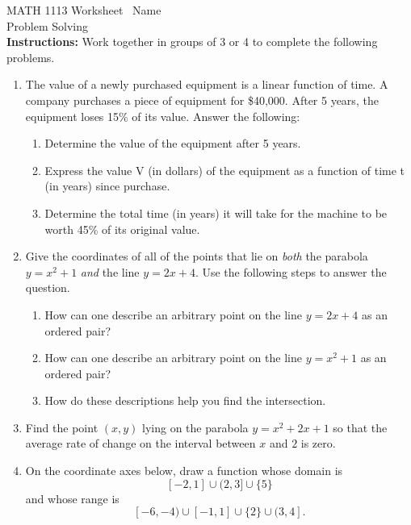 \documentclass[11pt]{article}
\begin{document}
\noindent MATH 1113   \quad\quad\quad\quad\quad Worksheet \quad\quad\quad\quad\quad\   Name \underline{\phantom{alphabetsoupismyveryveryfavorite}}\\ 
\noindent Problem Solving \\

\noindent \textbf{Instructions:}  Work together in groups of  3 or 4 to complete the following problems.


\begin{enumerate}



\item The value of a newly purchased equipment is a linear function of time. A company purchases a piece of equipment for \$40,000. After 5 years, the equipment loses 15\% of its value. Answer the following:

\begin{enumerate}
\item Determine the value of the equipment after 5 years.
\item Express the value V (in dollars) of the equipment as a function of time t (in years) since purchase.
\item Determine the total time (in years) it will take for the machine to be worth 45\% of its original value.
\end{enumerate}

\vfill

\item Give the coordinates of all of the points that lie on \emph{both} the parabola $y=x^2+1$ \emph{and} the line $y=2x+4$.  Use the following steps to answer the question.
	\begin{enumerate}
		\item How can one describe an arbitrary point on the line $y=2x+4$ as an ordered pair?
		\item How can one describe an arbitrary point on the line $y=x^2+1$ as an ordered pair?
		\item How do these descriptions help you find the intersection.
	\end{enumerate}

\vfill
\newpage

\item Find the point $(x,y)$ lying on the parabola $y = x^2 + 2x + 1$ so that the average rate of change on the interval between $x$ and $2$ is zero.

\vfill

\item On the coordinate axes below, draw a function whose domain is
	$$[-2,1]\cup(2,3]\cup\{5\}$$
	and whose range is
	$$[-6,-4)\cup[-1,1]\cup\{2\}\cup(3,4].$$


\end{enumerate}
\end{document}
